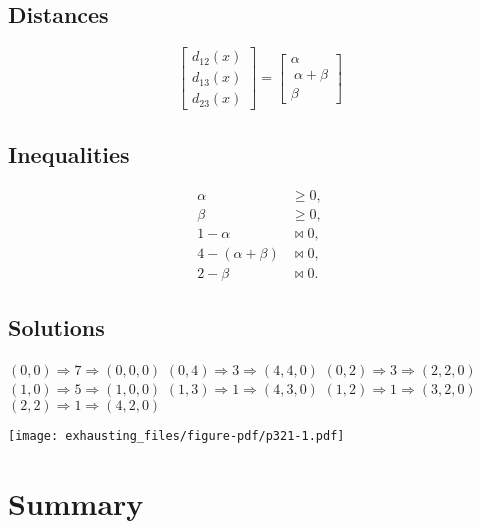 \documentclass[
  12pt,
  letterpaper,
  DIV=11,
  numbers=noendperiod]{scrartcl}
\begin{document}
\subsection{Distances}\label{distances-5}

\[
\begin{bmatrix}
d_{12}(x)\\
d_{13}(x)\\
d_{23}(x)
\end{bmatrix}
=\begin{bmatrix}
\alpha\\\
\alpha+\beta\\
\beta
\end{bmatrix}
\]

\subsection{Inequalities}\label{inequalities-5}

\begin{align}
\alpha&\geq 0,\\
\beta&\geq 0,\\
1-\alpha&\bowtie 0,\\
4-(\alpha+\beta)&\bowtie 0,\\
2-\beta&\bowtie 0.
\end{align}

\subsection{Solutions}\label{solutions-5}

\((0,0)\Rightarrow 7\Rightarrow(0,0,0)\)\newline
\((0,4)\Rightarrow 3\Rightarrow(4,4,0)\)\newline
\((0,2)\Rightarrow 3\Rightarrow(2,2,0)\)\newline
\((1,0)\Rightarrow 5\Rightarrow(1,0,0)\)\newline
\((1,3)\Rightarrow 1\Rightarrow(4,3,0)\)\newline
\((1,2)\Rightarrow 1\Rightarrow(3,2,0)\)\newline
\((2,2)\Rightarrow 1\Rightarrow(4,2,0)\)\newline

\begin{center}
\texttt{[image: exhausting\_files/figure-pdf/p321-1.pdf]}
\end{center}

\pagebreak

\section{Summary}\label{summary}
\end{document}
